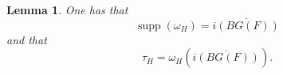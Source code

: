 \documentclass[a4paper,english,12pt]{amsart}
\newcommand{\CC}{\mathbb{C}}
\newcommand{\vMF}{v\in M_F}
\newcommand{\AAA}{\mathbb A}
\DeclareMathOperator{\supp}{supp}
\def\no{n\textsuperscript{0}\,}
\newtheorem{mydef}[equation]{Definition}
\newtheorem{lem}[equation]{Lemma}
\numberwithin{equation}{subsection}
\begin{document}
\begin{lem}\label{supportofmeasureo}
One has that $$\supp(\omega_H)=\overline{i(BG(F))}$$ and that $$ \tau_H=\omega_H(\overline{i(BG(F))}).$$
\end{lem}
\end{document}
